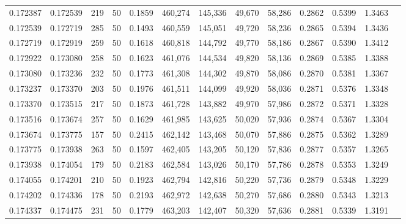 \begin{tabular}{rrrrrrrrrrrrr}
0.172387 & 0.172539 &   219 &  50 &                                     0.1859 & 460,274 & 145,336 &  49,670 &  58,286 & 0.2862 & 0.5399 & 1.3463 \\
0.172539 & 0.172719 &   285 &  50 &                                     0.1493 & 460,559 & 145,051 &  49,720 &  58,236 & 0.2865 & 0.5394 & 1.3436 \\
0.172719 & 0.172919 &   259 &  50 &                                     0.1618 & 460,818 & 144,792 &  49,770 &  58,186 & 0.2867 & 0.5390 & 1.3412 \\
0.172922 & 0.173080 &   258 &  50 &                                     0.1623 & 461,076 & 144,534 &  49,820 &  58,136 & 0.2869 & 0.5385 & 1.3388 \\
0.173080 & 0.173236 &   232 &  50 &                                     0.1773 & 461,308 & 144,302 &  49,870 &  58,086 & 0.2870 & 0.5381 & 1.3367 \\
0.173237 & 0.173370 &   203 &  50 &                                     0.1976 & 461,511 & 144,099 &  49,920 &  58,036 & 0.2871 & 0.5376 & 1.3348 \\
0.173370 & 0.173515 &   217 &  50 &                                     0.1873 & 461,728 & 143,882 &  49,970 &  57,986 & 0.2872 & 0.5371 & 1.3328 \\
0.173516 & 0.173674 &   257 &  50 &                                     0.1629 & 461,985 & 143,625 &  50,020 &  57,936 & 0.2874 & 0.5367 & 1.3304 \\
0.173674 & 0.173775 &   157 &  50 &                                     0.2415 & 462,142 & 143,468 &  50,070 &  57,886 & 0.2875 & 0.5362 & 1.3289 \\
0.173775 & 0.173938 &   263 &  50 &                                     0.1597 & 462,405 & 143,205 &  50,120 &  57,836 & 0.2877 & 0.5357 & 1.3265 \\
0.173938 & 0.174054 &   179 &  50 &                                     0.2183 & 462,584 & 143,026 &  50,170 &  57,786 & 0.2878 & 0.5353 & 1.3249 \\
0.174055 & 0.174201 &   210 &  50 &                                     0.1923 & 462,794 & 142,816 &  50,220 &  57,736 & 0.2879 & 0.5348 & 1.3229 \\
0.174202 & 0.174336 &   178 &  50 &                                     0.2193 & 462,972 & 142,638 &  50,270 &  57,686 & 0.2880 & 0.5343 & 1.3213 \\
0.174337 & 0.174475 &   231 &  50 &                                     0.1779 & 463,203 & 142,407 &  50,320 &  57,636 & 0.2881 & 0.5339 & 1.3191 \\

\end{tabular}
